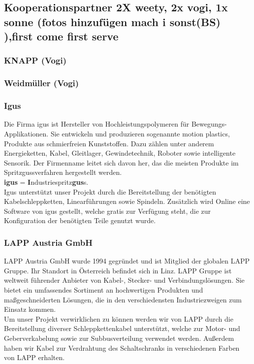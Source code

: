 \subsection{Kooperationspartner 2X weety, 2x vogi, 1x sonne  (fotos hinzufügen mach i sonst(BS) ),first come first serve}

\subsubsection{KNAPP (Vogi)}

\subsubsection{Weidmüller (Vogi)}

\subsubsection{Igus}
Die Firma igus ist Hersteller von Hochleistungspolymeren für Bewegungs-Applikationen. Sie entwickeln und produzieren sogenannte motion plastics, Produkte aus schmierfreien Kunststoffen. Dazu zählen unter anderem Energieketten, Kabel, Gleitlager, Gewindetechnik, Roboter sowie intelligente Sensorik. Der Firmenname leitet sich davon her, das die meisten Produkte im Spritzgussverfahren hergestellt werden.\\
\textbf{igus} = \textbf{I}ndustriespritz\textbf{gus}s. \cite{igus} \\
Igus unterstützt unser Projekt durch die Bereitstellung der benötigten Kabelschleppketten, Linearführungen sowie Spindeln. Zusätzlich wird Online eine Software von igus gestellt, welche gratis zur Verfügung steht, die zur Konfiguration der benötigten Teile genutzt wurde.

\subsubsection{LAPP Austria GmbH}
LAPP Austria GmbH wurde 1994 gegründet und ist Mitglied der globalen LAPP Gruppe. Ihr Standort in Österreich befindet sich in Linz. LAPP Gruppe ist weltweit führender Anbieter von Kabel-, Stecker- und Verbindungslösungen. Sie bietet ein umfassendes Sortiment an hochwertigen Produkten und maßgeschneiderten Lösungen, die in den verschiedensten Industriezweigen zum Einsatz kommen.\cite{lapp}\\
Um unser Projekt verwirklichen zu können werden wir von LAPP durch die Bereitstellung diverser Schleppkettenkabel unterstützt, welche zur Motor- und Geberverkabelung sowie zur Subbusverteilung verwendet werden. Außerdem haben wir Kabel zur Verdrahtung des Schaltschranks in verschiedenen Farben von LAPP erhalten.

